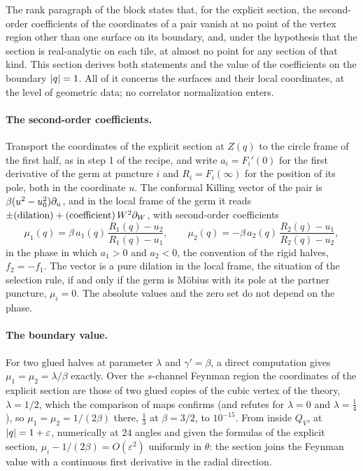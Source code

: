 The rank paragraph of the block states that, for the explicit section, the second-order coefficients of the coordinates of a pair vanish at no point of the vertex region other than one surface on its boundary, and, under the hypothesis that the section is real-analytic on each tile, at almost no point for any section of that kind.
This section derives both statements and the value of the coefficients on the boundary ${|q|} = 1$.
All of it concerns the surfaces and their local coordinates, at the level of geometric data; no correlator normalization enters.

\paragraph{The second-order coefficients.}
Transport the coordinates of the explicit section at $Z(q)$ to the circle frame of the first half, as in step 1 of the recipe, and write $a_i = F_i'(0)$ for the first derivative of the germ at puncture $i$ and $R_i = F_i(\infty)$ for the position of its pole, both in the coordinate $u$.
The conformal Killing vector of the pair is $\beta (u^2 - u_0^2) \partial_u$, and in the local frame of the germ it reads $\pm (\text{dilation}) + (\text{coefficient}) \, W^2 \partial_W$, with second-order coefficients
\begin{equation}
  \label{eq:wscircle:mu}
  \mu_1(q)
    = \beta \, a_1(q) \, \frac{R_1(q) - u_2}{R_1(q) - u_1},
  \qquad
  \mu_2(q)
    = - \beta \, a_2(q) \, \frac{R_2(q) - u_1}{R_2(q) - u_2},
\end{equation}
in the phase in which $a_1 > 0$ and $a_2 < 0$, the convention of the rigid halves, $f_2 = - f_1$.
The vector is a pure dilation in the local frame, the situation of the selection rule, if and only if the germ is Möbius with its pole at the partner puncture, $\mu_i = 0$.
The absolute values and the zero set do not depend on the phase.

\paragraph{The boundary value.}
For two glued halves at parameter $\lambda$ and $\gamma' = \beta$, a direct computation gives $\mu_1 = \mu_2 = \lambda / \beta$ exactly.
Over the $s$-channel Feynman region the coordinates of the explicit section are those of two glued copies of the cubic vertex of the theory, $\lambda = 1 / 2$, which the comparison of maps confirms (and refutes for $\lambda = 0$ and $\lambda = \tfrac{1}{4}$), so $\mu_1 = \mu_2 = 1 / (2 \beta)$ there, $\tfrac{1}{3}$ at $\beta = 3 / 2$, to $10^{-15}$.
From inside $Q_V$, at ${|q|} = 1 + \varepsilon$, numerically at $24$ angles and given the formulas of the explicit section, $\mu_i - 1 / (2 \beta) = O(\varepsilon^2)$ uniformly in $\theta$: the section joins the Feynman value with a continuous first derivative in the radial direction.

